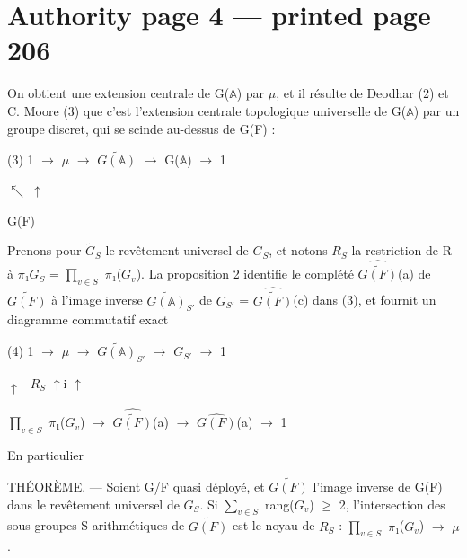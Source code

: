 \documentclass[10pt,a4paper]{article}
\begin{document}
\section*{Authority page 4 --- printed page 206}
\noindent On obtient une extension centrale de G(\ensuremath{𝔸}) par \ensuremath{μ}, et il résulte de Deodhar (2) et C. Moore (3) que c'est l'extension centrale topologique universelle de G(\ensuremath{𝔸}) par un groupe discret, qui se scinde au-dessus de G(F) :\par
\smallskip
\noindent (3)    1 \ensuremath{→} \ensuremath{μ} \ensuremath{→} \ensuremath{\widetilde{G(𝔸)}} \ensuremath{→} G(\ensuremath{𝔸}) \ensuremath{→} 1\par
\noindent                          \ensuremath{↖}          \ensuremath{↑}\par
\noindent                               G(F)\par
\smallskip
\noindent Prenons pour \ensuremath{\widetilde{G}_S} le revêtement universel de \ensuremath{G_S}, et notons \ensuremath{R_S} la restriction de R à \ensuremath{π₁}\ensuremath{G_S} = \ensuremath{∏_{v∈S}} \ensuremath{π₁}(\ensuremath{G_v}). La proposition 2 identifie le complété \ensuremath{\widehat{\widetilde{G(F)}}}(a) de \ensuremath{\widetilde{G(F)}} à l'image inverse \ensuremath{\widetilde{G(𝔸)}_{S′}} de \ensuremath{G_{S′}} = \ensuremath{\widehat{\widetilde{G(F)}}}(c) dans (3), et fournit un diagramme commutatif exact\par
\smallskip
\noindent (4)    1 \ensuremath{→} \ensuremath{μ} \ensuremath{→} \ensuremath{\widetilde{G(𝔸)}_{S′}} \ensuremath{→} \ensuremath{G_{S′}} \ensuremath{→} 1\par
\noindent              \ensuremath{↑−}\ensuremath{R_S}          \ensuremath{↑}i             \ensuremath{↑}\par
\noindent        \ensuremath{∏_{v∈S}} \ensuremath{π₁}(\ensuremath{G_v}) \ensuremath{→} \ensuremath{\widehat{\widetilde{G(F)}}}(a) \ensuremath{→} \ensuremath{\widehat{G(F)}}(a) \ensuremath{→} 1\par
\smallskip
\noindent En particulier\par
\smallskip
\noindent THÉORÈME. — Soient G/F quasi déployé, et \ensuremath{\widetilde{G(F)}} l'image inverse de G(F) dans le revêtement universel de \ensuremath{G_S}. Si \ensuremath{∑_{v∈S}} rang(\ensuremath{G_v}) \ensuremath{≥} 2, l'intersection des sous-groupes S-arithmétiques de \ensuremath{\widetilde{G(F)}} est le noyau de \ensuremath{R_S} : \ensuremath{∏_{v∈S}} \ensuremath{π₁}(\ensuremath{G_v}) \ensuremath{→} \ensuremath{μ}.\par
\end{document}
